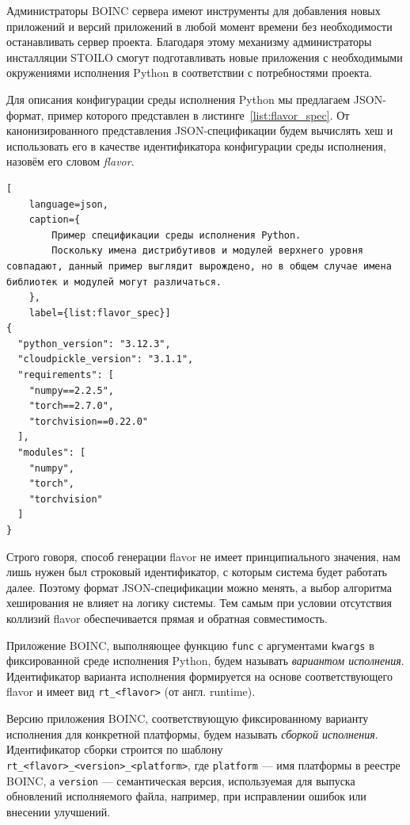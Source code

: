 \documentclass[a4paper,12pt]{extarticle}
\begin{document}
Администраторы BOINC сервера имеют инструменты для добавления новых приложений и версий приложений в любой момент времени без необходимости останавливать сервер проекта.
Благодаря этому механизму администраторы инсталляции STOILO смогут подготавливать новые приложения с необходимыми окружениями исполнения Python в соответствии с потребностями проекта.

Для описания конфигурации среды исполнения Python мы предлагаем JSON-формат, пример которого представлен в листинге~\ref{list:flavor_spec}.
От канонизированного представления JSON-спецификации будем вычислять хеш и использовать его в качестве идентификатора конфигурации среды исполнения, назовём его словом \textit{flavor}.

\begin{lstlisting}[
    language=json,
    caption={
        Пример спецификации среды исполнения Python.
        Поскольку имена дистрибутивов и модулей верхнего уровня совпадают, данный пример выглядит вырождено, но в общем случае имена библиотек и модулей могут различаться.
    },
    label={list:flavor_spec}]
{
  "python_version": "3.12.3",
  "cloudpickle_version": "3.1.1",
  "requirements": [
    "numpy==2.2.5",
    "torch==2.7.0",
    "torchvision==0.22.0"
  ],
  "modules": [
    "numpy",
    "torch",
    "torchvision"
  ]
}
\end{lstlisting}

Строго говоря, способ генерации flavor не имеет принципиального значения, нам лишь нужен был строковый идентификатор, с которым система будет работать далее.
Поэтому формат JSON-спецификации можно менять, а выбор алгоритма хеширования не влияет на логику системы.
Тем самым при условии отсутствия коллизий flavor обеспечивается прямая и обратная совместимость.

Приложение BOINC, выполняющее функцию \texttt{func} с аргументами \texttt{kwargs} в фиксированной среде исполнения Python, будем называть \textit{вариантом исполнения}.
Идентификатор варианта исполнения формируется на основе соответствующего flavor и имеет вид \newline\texttt{rt\_<flavor>} (от англ. runtime).

Версию приложения BOINC, соответствующую фиксированному варианту исполнения для конкретной платформы, будем называть \textit{сборкой исполнения}.
Идентификатор сборки строится по шаблону \texttt{rt\_<flavor>\_<version>\_<platform>}, где \texttt{platform} — имя платформы в реестре BOINC, а \texttt{version} — семантическая версия, используемая для выпуска обновлений исполняемого файла, например, при исправлении ошибок или внесении улучшений.
\end{document}
